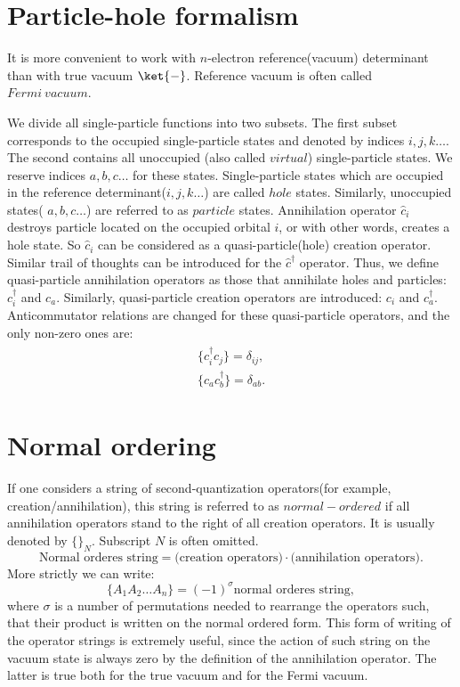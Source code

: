 \documentclass[twoside,english]{uiofysmaster}
\begin{document}
\begin{appendices}
\section{Particle-hole formalism}
It is more convenient to work with $n$-electron reference(vacuum) determinant than with true vacuum $\ket{-}$. Reference vacuum is often called $Fermi\ vacuum$.

We divide all single-particle functions into two subsets. The first subset corresponds to the occupied single-particle states and denoted by indices $i,j,k\dots$. The second contains all unoccupied (also called $virtual$) single-particle states. We reserve indices $a,b,c \dots$ for these states. Single-particle states which are occupied in the reference determinant($i,j,k\dots$) are called $hole$ states. Similarly, unoccupied states( $a,b,c \dots$) are referred to as $particle$ states. 
Annihilation operator $\hat{c}_i$ destroys particle located on the occupied orbital $i$, or with other words, creates a hole state. So $\hat{c}_i$ can be considered as a quasi-particle(hole) creation operator. Similar trail of thoughts can be introduced for the $\hat{c}^\dagger$ operator. Thus, we define quasi-particle annihilation operators as those that annihilate holes and particles: $c_i^\dagger$ and $c_a$. Similarly, quasi-particle creation operators are introduced: $c_i$ and $c_a^\dagger$. Anticommutator relations are changed for these quasi-particle operators, and the only non-zero ones are:
\begin{align}
\begin{split}
\{c_i^\dagger c_j\} = \delta_{ij},\\
\{ c_a c_b^\dagger\} = \delta_{ab}.
\end{split}
\end{align} 


\section{Normal ordering}

If one considers a string of second-quantization operators(for example, creation/annihilation), this string is referred to as $normal-ordered$ if all annihilation operators stand to the right of all creation
operators. It is usually denoted by $\{\}_N$. Subscript $N$ is often omitted.
\begin{equation*}
\text{Normal orderes string} = \text{(creation operators)} \cdot \text{(annihilation operators)}.
\end{equation*}
More strictly we can write:
\begin{equation}
\{A_1 A_2 \dots A_n\} = (-1)^{\sigma} \text{normal orderes string},
\end{equation}
where $\sigma$ is a number of permutations needed to rearrange the operators such, that their product is written on the normal ordered form.
This form of writing of the operator strings is extremely useful, since the action of such string on the vacuum state is always zero by the definition of the annihilation operator. The latter is true both for the true vacuum and for the Fermi vacuum.


\end{appendices}
\end{document}
